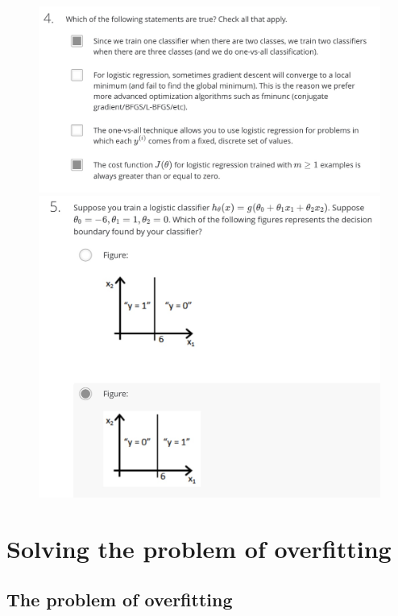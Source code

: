 \documentclass[12pt, A4,onecolumn]{article} %
\begin{document}
\begin{figure}[H]
  \includegraphics[width=\linewidth]{./Imagenes/testFLogicReg4}
\endminipage\hfill
{}
  \includegraphics[width=\linewidth]{./Imagenes/testFLogicReg5}
\endminipage\hfill
\end{figure}


\section{Solving the problem of overfitting}
\subsection{The problem of overfitting}
\end{document}
